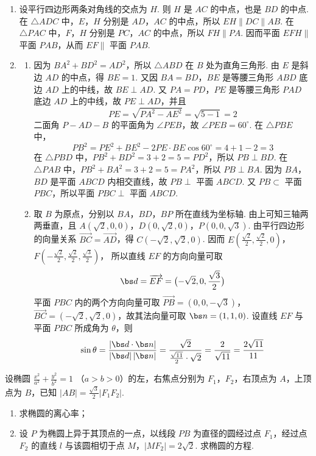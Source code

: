 \begin{solution}
\begin{enumerate}
\item 设平行四边形两条对角线的交点为 \(H\). 则 \(H\) 是 \(AC\) 的中点，也是 \(BD\) 的中点. 在 \(\triangle ADC\) 中，\(E\)，\(H\) 分别是 \(AD\)，\(AC\) 的中点，所以 \(EH\parallel DC\parallel AB\). 在 \(\triangle PAC\) 中，\(F\)，\(H\) 分别是 \(PC\)，\(AC\) 的中点，所以 \(FH\parallel PA\). 因而平面 \(EFH\parallel\) 平面 \(PAB\)，从而 \(EF\parallel\) 平面 \(PAB\).
\item
\begin{enumerate}
\item 因为 \(BA^2+BD^2=AD^2\)，所以 \(\triangle ABD\) 在 \(B\) 处为直角三角形. 由 \(E\) 是斜边 \(AD\) 的中点，得 \(BE=1\). 又因 \(BA=BD\)，\(BE\) 是等腰三角形 \(ABD\) 底边 \(AD\) 上的中线，故 \(BE\perp AD\). 又 \(PA=PD\)，\(PE\) 是等腰三角形 \(PAD\) 底边 \(AD\) 上的中线，故 \(PE\perp AD\)，并且
\[
PE=\sqrt{PA^2-AE^2}=\sqrt{5-1}=2
\]
二面角 \(P-AD-B\) 的平面角为 \(\angle PEB\)，故 \(\angle PEB=60^{\circ}\). 在 \(\triangle PBE\) 中，
\[
PB^2=PE^2+BE^2-2PE\cdot BE\cos60^{\circ}=4+1-2=3
\]
在 \(\triangle PBD\) 中，\(PB^2+BD^2=3+2=5=PD^2\)，所以 \(PB\perp BD\). 在 \(\triangle PAB\) 中，\(PB^2+BA^2=3+2=5=PA^2\)，所以 \(PB\perp BA\). 因为 \(BA\)，\(BD\) 是平面 \(ABCD\) 内相交直线，故 \(PB\perp\) 平面 \(ABCD\). 又 \(PB\subset\) 平面 \(PBC\)，所以平面 \(PBC\perp\) 平面 \(ABCD\).
\item 取 \(B\) 为原点，分别以 \(BA\)，\(BD\)，\(BP\) 所在直线为坐标轴. 由上可知三轴两两垂直，且
\(A(\sqrt2,0,0)\)，\(D(0,\sqrt2,0)\)，\(P(0,0,\sqrt3)\).
由平行四边形的向量关系 \(\overrightarrow{BC}=\overrightarrow{AD}\)，得 \(C(-\sqrt2,\sqrt2,0)\). 因而
\(E\left(\frac{\sqrt2}{2},\frac{\sqrt2}{2},0\right)\)，\(F\left(-\frac{\sqrt2}{2},\frac{\sqrt2}{2},\frac{\sqrt3}{2}\right)\)，
所以直线 \(EF\) 的方向向量可取
\[
\bs d=\overrightarrow{EF}=\bigl(-\sqrt2,0,\frac{\sqrt3}{2}\bigr)
\]
平面 \(PBC\) 内的两个方向向量可取 \(\overrightarrow{PB}=(0,0,-\sqrt3)\)，\(\overrightarrow{BC}=(-\sqrt2,\sqrt2,0)\)，故其法向量可取 \(\bs n=(1,1,0)\). 设直线 \(EF\) 与平面 \(PBC\) 所成角为 \(\theta\)，则
\[
\sin\theta=\frac{|\bs d\cdot\bs n|}{|\bs d|\,|\bs n|}=\frac{\sqrt2}{\frac{\sqrt{11}}2\cdot\sqrt2}=\frac2{\sqrt{11}}=\frac{2\sqrt{11}}{11}
\]
\end{enumerate}
\end{enumerate}
\end{solution}

\begin{problem}
设椭圆 \(\frac{x^2}{a^2} + \frac{y^2}{b^2} = 1\) （\(a > b > 0\)）的左，右焦点分别为 \(F_1\)，\(F_2\)，右顶点为 \(A\)，上顶点为 \(B\)，已知 \(|AB| = \frac{\sqrt{3}}{2} |F_1F_2|\).

\begin{enumerate}
\item 求椭圆的离心率；
\item 设 \(P\) 为椭圆上异于其顶点的一点，以线段 \(PB\) 为直径的圆经过点 \(F_{1}\)，经过点 \(F_{2}\) 的直线 \(l\) 与该圆相切于点 \(M\)，\(|MF_{2}| = 2\sqrt{2}\). 求椭圆的方程.
\end{enumerate}
\end{problem}

